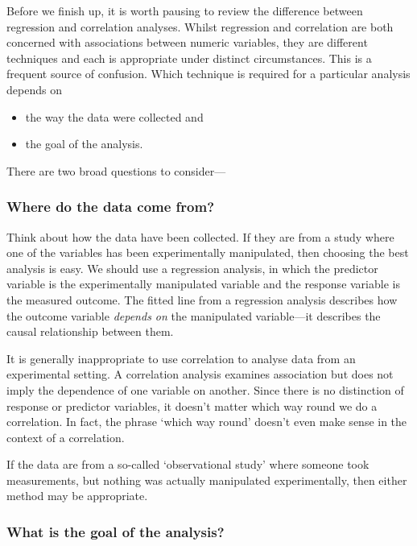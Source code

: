 \documentclass[
]{book}
\providecommand{\tightlist}{%
  \setlength{\itemsep}{0pt}\setlength{\parskip}{0pt}}
\begin{document}
Before we finish up, it is worth pausing to review the difference between regression and correlation analyses. Whilst regression and correlation are both concerned with associations between numeric variables, they are different techniques and each is appropriate under distinct circumstances. This is a frequent source of confusion. Which technique is required for a particular analysis depends on

\begin{itemize}
\tightlist
\item
  the way the data were collected and
\item
  the goal of the analysis.
\end{itemize}

There are two broad questions to consider---

\hypertarget{where-do-the-data-come-from}{%
\subsubsection*{Where do the data come from?}\label{where-do-the-data-come-from}}

Think about how the data have been collected. If they are from a study where one of the variables has been experimentally manipulated, then choosing the best analysis is easy. We should use a regression analysis, in which the predictor variable is the experimentally manipulated variable and the response variable is the measured outcome. The fitted line from a regression analysis describes how the outcome variable \emph{depends on} the manipulated variable---it describes the causal relationship between them.

It is generally inappropriate to use correlation to analyse data from an experimental setting. A correlation analysis examines association but does not imply the dependence of one variable on another. Since there is no distinction of response or predictor variables, it doesn't matter which way round we do a correlation. In fact, the phrase `which way round' doesn't even make sense in the context of a correlation.

If the data are from a so-called `observational study' where someone took measurements, but nothing was actually manipulated experimentally, then either method may be appropriate.

\hypertarget{what-is-the-goal-of-the-analysis}{%
\subsubsection*{What is the goal of the analysis?}\label{what-is-the-goal-of-the-analysis}}
\end{document}
